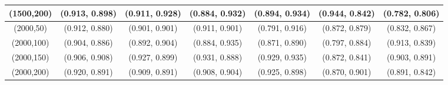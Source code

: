 \begin{table*}[]
{\begin{tabular}{c|ccc|ccc}
(1500,200) & (0.913, 0.898) & (0.911, 0.928) & (0.884, 0.932) & (0.894, 0.934) & (0.944, 0.842) & (0.782, 0.806)\\
\midrule
(2000,50) & (0.912, 0.880) & (0.901, 0.901) & (0.911, 0.901) & (0.791, 0.916) & (0.872, 0.879) & (0.832, 0.867)\\
(2000,100) & (0.904, 0.886) & (0.892, 0.904) & (0.884, 0.935) & (0.871, 0.890) & (0.797, 0.884) & (0.913, 0.839)\\
(2000,150) & (0.906, 0.908) & (0.927, 0.899) & (0.931, 0.888) & (0.929, 0.935) & (0.872, 0.841) & (0.903, 0.891)\\
(2000,200) & (0.920, 0.891) & (0.909, 0.891) & (0.908, 0.904) & (0.925, 0.898) & (0.870, 0.901) & (0.891, 0.842)\\
\bottomrule
\bottomrule
\end{tabular}}
\end{table*}